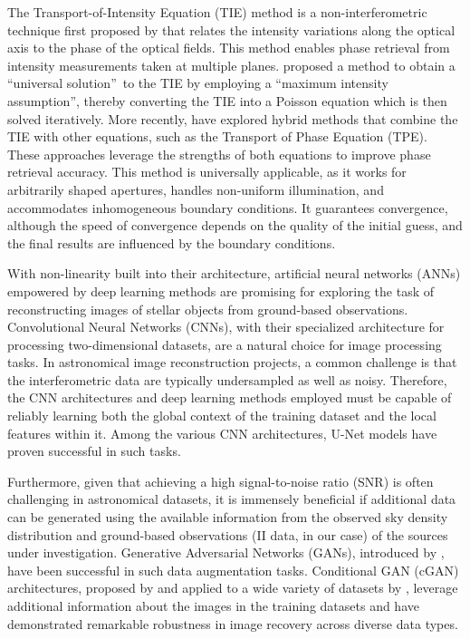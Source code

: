 The Transport-of-Intensity Equation (TIE) method is a non-interferometric technique first proposed by \cite{Teague1983} that relates the intensity variations along the optical axis to the phase of the optical fields. This method enables phase retrieval from intensity measurements taken at multiple planes. \cite{Zhang2020} proposed a method to obtain a \textquotedblleft universal solution\textquotedblright\ to the TIE by employing a \textquotedblleft maximum intensity assumption\textquotedblright, thereby converting the TIE into a Poisson equation which is then solved iteratively. More recently, \cite{Kirisits2024} have explored hybrid methods that combine the TIE with other equations, such as the Transport of Phase Equation (TPE). These approaches leverage the strengths of both equations to improve phase retrieval accuracy. This method is universally applicable, as it works for arbitrarily shaped apertures, handles non-uniform illumination, and accommodates inhomogeneous boundary conditions. It guarantees convergence, although the speed of convergence depends on the quality of the initial guess, and the final results are influenced by the boundary conditions.

With non-linearity built into their architecture, artificial neural networks (ANNs) empowered by deep learning methods are promising for exploring the task of reconstructing images of stellar objects from ground-based observations. Convolutional Neural Networks (CNNs), with their specialized architecture for processing two-dimensional datasets, are a natural choice for image processing tasks. In astronomical image reconstruction projects, a common challenge is that the interferometric data are typically undersampled as well as noisy.  Therefore, the CNN architectures and deep learning methods employed must be capable of reliably learning both the global context of the training dataset and the local features within it. Among the various CNN architectures, U-Net models \citep{ronneberger2015u} have proven successful in such tasks.

Furthermore, given that achieving a high signal-to-noise ratio (SNR) is often challenging in astronomical datasets, it is immensely beneficial if additional data can be generated using the available information from the observed sky density distribution and ground-based observations (II data, in our case) of the sources under investigation. Generative Adversarial Networks (GANs), introduced by \cite{goodfellow2014generative}, have been successful in such data augmentation tasks. Conditional GAN (cGAN) architectures, proposed by \cite{mirza2014conditional} and applied to a wide variety of datasets by \cite{isola2017image}, leverage additional information about the images in the training datasets and have demonstrated remarkable robustness in image recovery across diverse data types.

